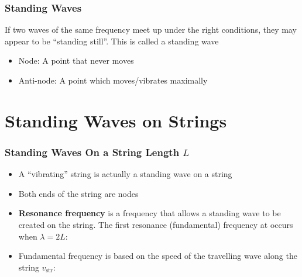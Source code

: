 \documentclass[12pt,aspectratio=169]{beamer}
\newcommand{\eq}[2]{\vspace{#1}{\Large\begin{displaymath}#2\end{displaymath}}}
\begin{document}
\begin{frame}
  \frametitle{Standing Waves}
  If two waves of the same frequency meet up under the right conditions, they
  may appear to be ``standing still''. This is called a standing wave
  \begin{itemize}
  \item Node: A point that never moves
  \item Anti-node: A point which moves/vibrates maximally
  \end{itemize}
\end{frame}


\section[Strings]{Standing Waves on Strings}

\begin{frame}
  \frametitle{Standing Waves On a String Length $L$}
  \begin{itemize}
  \item A ``vibrating'' string is actually a standing wave on a string
  \item Both ends of the string are nodes
  \item\textbf{Resonance frequency} is a frequency that allows a standing wave
    to be created on the string. The first resonance (fundamental) frequency at
    occurs when $\lambda=2L$:
    \begin{center}
    \end{center}
  \item Fundamental frequency is based on the speed of the
    travelling wave along the string $v_\mathrm{str}$:

    \eq{-.3in}{
      \boxed{f_1=\frac{v_\mathrm{str}}{\lambda}=\frac{v_\mathrm{str}}{2L}}
    }
  \end{itemize}
\end{frame}
\end{document}
